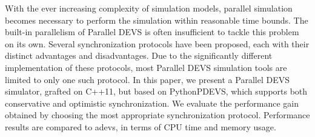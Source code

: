 With the ever increasing complexity of simulation models, parallel simulation
becomes necessary to perform the simulation within reasonable time bounds.
The built-in parallelism of Parallel DEVS is often insufficient to tackle this problem on its own.
Several synchronization protocols have been proposed, each with their distinct advantages and disadvantages.
Due to the significantly different implementation of these protocols, most Parallel DEVS simulation tools are limited to only one such protocol.
In this paper, we present a Parallel DEVS simulator, grafted on C++11, but based on PythonPDEVS, which supports both conservative and optimistic synchronization.
We evaluate the performance gain obtained by choosing the most appropriate synchronization protocol.
Performance results are compared to adevs, in terms of CPU time and memory usage.
